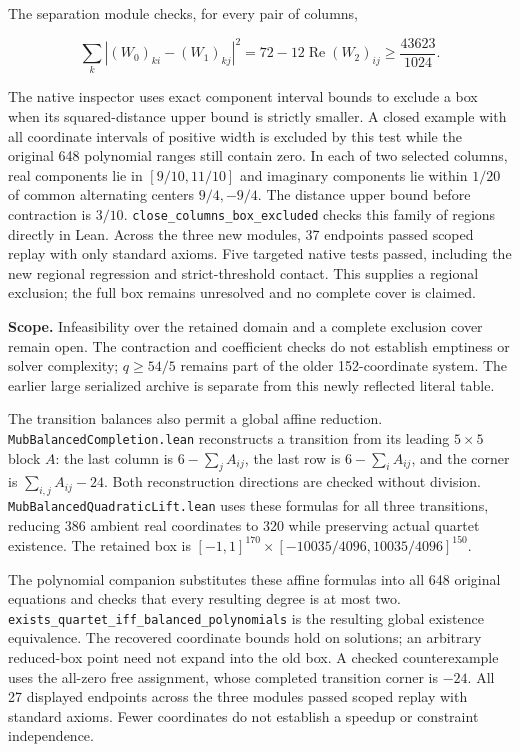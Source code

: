 \documentclass[
]{article}
\begin{document}
The separation module checks, for every pair of columns,

\[
\sum_k |(W_0)_{ki}-(W_1)_{kj}|^2
=72-12\operatorname{Re}(W_2)_{ij}\ge\frac{43623}{1024}.
\]

The native inspector uses exact component interval bounds to exclude a
box when its squared-distance upper bound is strictly smaller. A closed
example with all coordinate intervals of positive width is excluded by
this test while the original 648 polynomial ranges still contain zero.
In each of two selected columns, real components lie in \([9/10,11/10]\)
and imaginary components lie within \(1/20\) of common alternating
centers \(9/4,-9/4\). The distance upper bound before contraction is
\(3/10\). \nolinkurl{close_columns_box_excluded} checks this family of
regions directly in Lean. Across the three new modules, 37 endpoints
passed scoped replay with only standard axioms. Five targeted native
tests passed, including the new regional regression and strict-threshold
contact. This supplies a regional exclusion; the full box remains
unresolved and no complete cover is claimed.

\textbf{Scope.} Infeasibility over the retained domain and a complete
exclusion cover remain open. The contraction and coefficient checks do
not establish emptiness or solver complexity; \(q\ge54/5\) remains part
of the older 152-coordinate system. The earlier large serialized archive
is separate from this newly reflected literal table.

The transition balances also permit a global affine reduction.
\nolinkurl{MubBalancedCompletion.lean} reconstructs a transition from
its leading \(5\times5\) block \(A\): the last column is
\(6-\sum_j A_{ij}\), the last row is \(6-\sum_i A_{ij}\), and the corner
is \(\sum_{i,j}A_{ij}-24\). Both reconstruction directions are checked
without division. \nolinkurl{MubBalancedQuadraticLift.lean} uses these
formulas for all three transitions, reducing 386 ambient real
coordinates to 320 while preserving actual quartet existence. The
retained box is \([-1,1]^{170}\times[-10035/4096,10035/4096]^{150}\).

The polynomial companion substitutes these affine formulas into all 648
original equations and checks that every resulting degree is at most
two. \nolinkurl{exists_quartet_iff_balanced_polynomials} is the
resulting global existence equivalence. The recovered coordinate bounds
hold on solutions; an arbitrary reduced-box point need not expand into
the old box. A checked counterexample uses the all-zero free assignment,
whose completed transition corner is \(-24\). All 27 displayed endpoints
across the three modules passed scoped replay with standard axioms.
Fewer coordinates do not establish a speedup or constraint independence.
\end{document}

